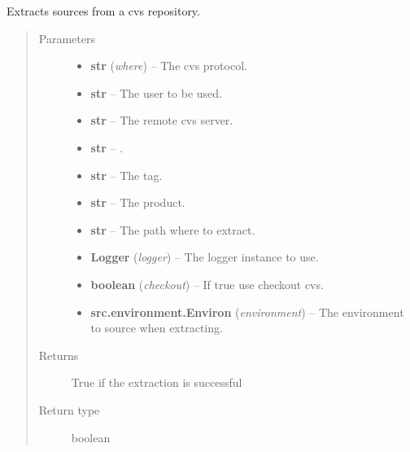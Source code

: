 \documentclass[a4paper,10pt,english]{sphinxmanual}
\begin{document}
\begin{fulllineitems}
\label{commands/apidoc/src:src.system.cvs_extract}
Extracts sources from a cvs repository.
\begin{quote}\begin{description}
\item[{Parameters}] \leavevmode\begin{itemize}
\item {} 
\textbf{str} (\emph{where}) -- The cvs protocol.

\item {} 
\textbf{str} -- The user to be used.

\item {} 
\textbf{str} -- The remote cvs server.

\item {} 
\textbf{str} -- 
.


\item {} 
\textbf{str} -- The tag.

\item {} 
\textbf{str} -- The product.

\item {} 
\textbf{str} -- The path where to extract.

\item {} 
\textbf{Logger} (\emph{logger}) -- The logger instance to use.

\item {} 
\textbf{boolean} (\emph{checkout}) -- If true use checkout cvs.

\item {} 
\textbf{src.environment.Environ} (\emph{environment}) -- The environment to source when
extracting.

\end{itemize}

\item[{Returns}] \leavevmode
True if the extraction is successful

\item[{Return type}] \leavevmode
boolean

\end{description}\end{quote}

\end{fulllineitems}
\end{document}
